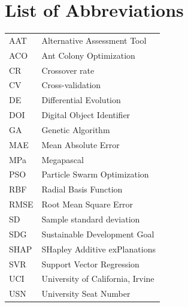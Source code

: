\chapter*{List of Abbreviations}
\noindent\begin{tabularx}{\textwidth}{lX}
AAT & Alternative Assessment Tool\\
ACO & Ant Colony Optimization\\
CR & Crossover rate\\
CV & Cross-validation\\
DE & Differential Evolution\\
DOI & Digital Object Identifier\\
GA & Genetic Algorithm\\
MAE & Mean Absolute Error\\
MPa & Megapascal\\
PSO & Particle Swarm Optimization\\
RBF & Radial Basis Function\\
RMSE & Root Mean Square Error\\
SD & Sample standard deviation\\
SDG & Sustainable Development Goal\\
SHAP & SHapley Additive exPlanations\\
SVR & Support Vector Regression\\
UCI & University of California, Irvine\\
USN & University Seat Number\\
\end{tabularx}\par
